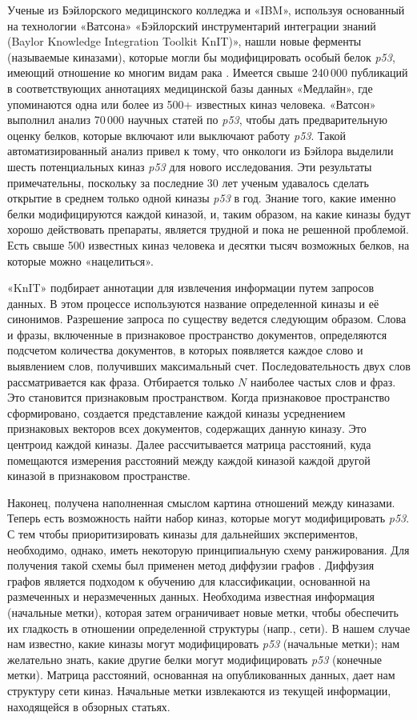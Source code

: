 Ученые из Бэйлорского медицинского колледжа и «IBM», используя основанный на технологии «Ватсона» «Бэйлорский 
инструментарий интеграции знаний (Baylor Knowledge Integration Toolkit KnIT)», нашли новые ферменты 
(называемые киназами), которые могли бы модифицировать особый белок \textit{p53}, имеющий отношение ко многим видам 
рака \cite{spangler2014automated}. Имеется свыше 240\,000 публикаций в соответствующих аннотациях медицинской базы 
данных «Медлайн», где упоминаются одна или более из 500+ известных киназ человека. «Ватсон» выполнил анализ 70\,000 
научных статей по \textit{p53}, чтобы дать предварительную оценку белков, которые включают или выключают работу 
\textit{p53}. Такой автоматизированный анализ привел к тому, что онкологи из Бэйлора выделили шесть потенциальных 
киназ \textit{p53} для нового исследования. Эти результаты примечательны, поскольку за последние 30 лет ученым 
удавалось сделать открытие в среднем только одной киназы \textit{p53} в год. Знание того, какие именно белки 
модифицируются каждой киназой, и, таким образом, на какие киназы будут хорошо действовать препараты, является трудной и 
пока не решенной проблемой. Есть свыше 500 известных киназ человека и десятки тысяч возможных белков, на которые 
можно «нацелиться». 

«KnIT» подбирает аннотации для извлечения информации путем запросов данных. В этом процессе используются название 
определенной киназы и её синонимов. Разрешение запроса по существу ведется следующим образом. Слова и фразы, включенные 
в признаковое пространство документов, определяются подсчетом количества документов, в которых появляется каждое слово 
и выявлением слов, получивших максимальный счет. Последовательность двух слов рассматривается как фраза. Отбирается 
только $N$ наиболее частых слов и фраз. Это становится признаковым пространством. Когда признаковое пространство 
сформировано, создается представление каждой киназы усреднением признаковых векторов всех документов, содержащих 
данную киназу. Это центроид каждой киназы. Далее рассчитывается матрица расстояний, куда помещаются измерения 
расстояний между каждой киназой каждой другой киназой в признаковом пространстве.

Наконец, получена наполненная смыслом картина отношений между киназами. Теперь есть возможность найти набор киназ, 
которые могут модифицировать \textit{p53}. С тем чтобы приоритизировать киназы для дальнейших экспериментов, 
необходимо, однако, иметь некоторую принципиальную схему ранжирования. Для получения такой схемы был применен метод 
диффузии графов \cite{zhou2003learning}. Диффузия графов является подходом к обучению для классификации, основанной 
на размеченных и неразмеченных данных. Необходима известная информация (начальные метки), которая затем ограничивает 
новые метки, чтобы обеспечить их гладкость в отношении определенной структуры (напр., сети). В нашем случае нам 
известно, какие киназы могут модифицировать \textit{p53} (начальные метки); нам желательно знать, какие другие белки 
могут модифицировать \textit{p53} (конечные метки). Матрица расстояний, основанная на опубликованных данных, дает нам 
структуру сети киназ. Начальные метки извлекаются из текущей информации, находящейся в обзорных статьях.

